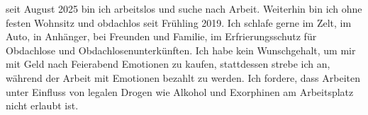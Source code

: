 		seit August 2025 bin ich arbeitslos und suche nach Arbeit.
		Weiterhin bin ich ohne festen Wohnsitz und obdachlos seit Frühling 2019.
		Ich schlafe gerne im Zelt, im Auto, in Anhänger, bei Freunden und Familie, im Erfrierungsschutz für Obdachlose und Obdachlosenunterkünften.
		Ich habe kein Wunschgehalt, um mir mit Geld nach Feierabend Emotionen zu kaufen, stattdessen strebe ich an, während der Arbeit mit Emotionen bezahlt zu werden.
		Ich fordere, dass Arbeiten unter Einfluss von legalen Drogen wie Alkohol und Exorphinen am Arbeitsplatz nicht erlaubt ist.